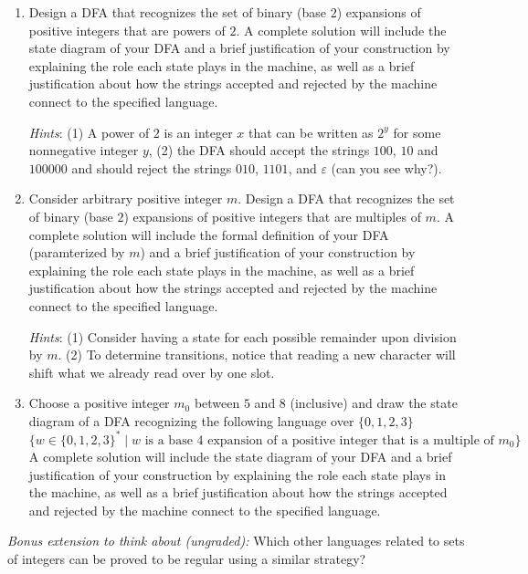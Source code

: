\begin{enumerate}[wide, labelwidth=!, labelindent=0pt]
    \begin{enumerate}
    \item\gradeCompleteFirst Design a DFA that recognizes the set of binary (base $2$) expansions of 
    positive integers that are powers of $2$. A complete solution will include the state diagram of your DFA and 
    a brief justification 
    of your construction by explaining the role each state plays in the machine, as well as a brief 
    justification about how the strings accepted and rejected by the machine connect to the specified language.

    {\it Hints}: (1) A power of $2$ is an integer $x$ that can be written as $2^y$ for some nonnegative integer $y$, 
    (2) the DFA should accept the strings $100$, $10$ and $100000$ and should reject the 
    strings $010$, $1101$, and $\varepsilon$ (can you see why?).

    \item\gradeComplete Consider arbitrary positive integer $m$. Design a DFA that recognizes the 
    set of binary (base $2$) expansions of positive integers that are multiples of $m$. A complete solution will
    include the formal definition of your DFA (paramterized by $m$) and a brief justification of your 
    construction by explaining the role each state plays in the machine, as well as a brief 
    justification about how the strings accepted and rejected by the machine connect to the specified language.

    {\it Hints}: (1) Consider having a state for each possible remainder upon division by $m$.
     (2) To determine transitions, notice that reading a new character will shift what we already read over by
     one slot.

    \item\gradeCorrectFirst Choose a positive integer $m_{0}$ between $5$ and $8$ (inclusive) and draw the state diagram
    of a DFA recognizing the following language over $\{0,1,2,3\}$ 
    $$\{ w \in \{0,1,2,3\}^* \mid w \text{ is a base $4$ expansion of a positive 
    integer that is a multiple of $m_0$}\}$$
    A complete solution will include the state diagram of your DFA and 
    a brief justification 
    of your construction by explaining the role each state plays in the machine, as well as a brief 
    justification about how the strings accepted and rejected by the machine connect to the specified language.
    \end{enumerate}

    {\it Bonus extension to think about (ungraded):} Which other languages related to sets of integers 
    can be proved to be regular using a similar strategy? 


\end{enumerate}
